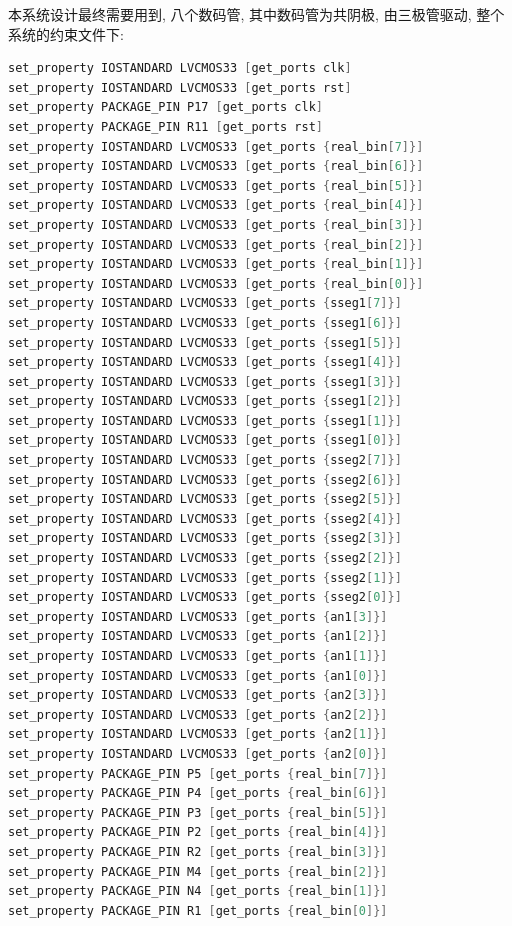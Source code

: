 \documentclass{article}
\begin{document}
本系统设计最终需要用到, 八个数码管, 其中数码管为共阴极, 由三极管驱动, 整个系统的约束文件下:
\begin{lstlisting}[language=Verilog, caption={系统约束文件}]
set_property IOSTANDARD LVCMOS33 [get_ports clk]
set_property IOSTANDARD LVCMOS33 [get_ports rst]
set_property PACKAGE_PIN P17 [get_ports clk]
set_property PACKAGE_PIN R11 [get_ports rst]
set_property IOSTANDARD LVCMOS33 [get_ports {real_bin[7]}]
set_property IOSTANDARD LVCMOS33 [get_ports {real_bin[6]}]
set_property IOSTANDARD LVCMOS33 [get_ports {real_bin[5]}]
set_property IOSTANDARD LVCMOS33 [get_ports {real_bin[4]}]
set_property IOSTANDARD LVCMOS33 [get_ports {real_bin[3]}]
set_property IOSTANDARD LVCMOS33 [get_ports {real_bin[2]}]
set_property IOSTANDARD LVCMOS33 [get_ports {real_bin[1]}]
set_property IOSTANDARD LVCMOS33 [get_ports {real_bin[0]}]
set_property IOSTANDARD LVCMOS33 [get_ports {sseg1[7]}]
set_property IOSTANDARD LVCMOS33 [get_ports {sseg1[6]}]
set_property IOSTANDARD LVCMOS33 [get_ports {sseg1[5]}]
set_property IOSTANDARD LVCMOS33 [get_ports {sseg1[4]}]
set_property IOSTANDARD LVCMOS33 [get_ports {sseg1[3]}]
set_property IOSTANDARD LVCMOS33 [get_ports {sseg1[2]}]
set_property IOSTANDARD LVCMOS33 [get_ports {sseg1[1]}]
set_property IOSTANDARD LVCMOS33 [get_ports {sseg1[0]}]
set_property IOSTANDARD LVCMOS33 [get_ports {sseg2[7]}]
set_property IOSTANDARD LVCMOS33 [get_ports {sseg2[6]}]
set_property IOSTANDARD LVCMOS33 [get_ports {sseg2[5]}]
set_property IOSTANDARD LVCMOS33 [get_ports {sseg2[4]}]
set_property IOSTANDARD LVCMOS33 [get_ports {sseg2[3]}]
set_property IOSTANDARD LVCMOS33 [get_ports {sseg2[2]}]
set_property IOSTANDARD LVCMOS33 [get_ports {sseg2[1]}]
set_property IOSTANDARD LVCMOS33 [get_ports {sseg2[0]}]
set_property IOSTANDARD LVCMOS33 [get_ports {an1[3]}]
set_property IOSTANDARD LVCMOS33 [get_ports {an1[2]}]
set_property IOSTANDARD LVCMOS33 [get_ports {an1[1]}]
set_property IOSTANDARD LVCMOS33 [get_ports {an1[0]}]
set_property IOSTANDARD LVCMOS33 [get_ports {an2[3]}]
set_property IOSTANDARD LVCMOS33 [get_ports {an2[2]}]
set_property IOSTANDARD LVCMOS33 [get_ports {an2[1]}]
set_property IOSTANDARD LVCMOS33 [get_ports {an2[0]}]
set_property PACKAGE_PIN P5 [get_ports {real_bin[7]}]
set_property PACKAGE_PIN P4 [get_ports {real_bin[6]}]
set_property PACKAGE_PIN P3 [get_ports {real_bin[5]}]
set_property PACKAGE_PIN P2 [get_ports {real_bin[4]}]
set_property PACKAGE_PIN R2 [get_ports {real_bin[3]}]
set_property PACKAGE_PIN M4 [get_ports {real_bin[2]}]
set_property PACKAGE_PIN N4 [get_ports {real_bin[1]}]
set_property PACKAGE_PIN R1 [get_ports {real_bin[0]}]

\end{lstlisting}
\end{document}
